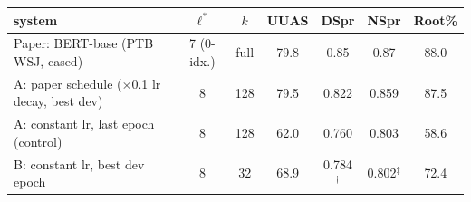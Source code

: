 \begin{tabular}{lcccccc}
\toprule
system & $\ell^*$ & $k$ & UUAS & DSpr & NSpr & Root\% \\
\midrule
Paper: BERT-base (PTB WSJ, cased) & 7 (0-idx.) & full & 79.8 & 0.85 & 0.87 & 88.0 \\
A: paper schedule ($\times$0.1 lr decay, best dev) & 8 & 128 & 79.5 & 0.822 & 0.859 & 87.5 \\
A: constant lr, last epoch (control) & 8 & 128 & 62.0 & 0.760 & 0.803 & 58.6 \\
B: constant lr, best dev epoch & 8 & 32 & 68.9 & 0.784$^\dagger$ & 0.802$^\ddagger$ & 72.4 \\
\bottomrule
\end{tabular}
